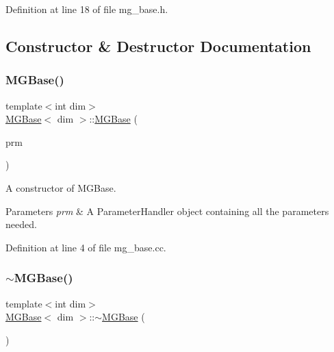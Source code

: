 Definition at line 18 of file mg\+\_\+base.\+h.



\subsection{Constructor \& Destructor Documentation}
\mbox{\label{class_m_g_base_ad938184229e773a339be9ba1fc487aa1}} 
\subsubsection{\texorpdfstring{M\+G\+Base()}{MGBase()}}
{\footnotesize\ttfamily template$<$int dim$>$ \\
\hyperlink{class_m_g_base}{M\+G\+Base}$<$ dim $>$\+::\hyperlink{class_m_g_base}{M\+G\+Base} (\begin{DoxyParamCaption}\item[{const Parameter\+Handler \&}]{prm }\end{DoxyParamCaption})}

A constructor of M\+G\+Base.


\begin{DoxyParams}{Parameters}
{\em prm} & A Parameter\+Handler object containing all the parameters needed. \\
\hline
\end{DoxyParams}


Definition at line 4 of file mg\+\_\+base.\+cc.

\mbox{\label{class_m_g_base_a011e50e1caf44cfa3335b95d161ba14d}} 
\subsubsection{\texorpdfstring{$\sim$\+M\+G\+Base()}{~MGBase()}}
{\footnotesize\ttfamily template$<$int dim$>$ \\
\hyperlink{class_m_g_base}{M\+G\+Base}$<$ dim $>$\+::$\sim$\hyperlink{class_m_g_base}{M\+G\+Base} (\begin{DoxyParamCaption}{ }\end{DoxyParamCaption})\hspace{0.3cm}{\ttfamily [virtual]}}



